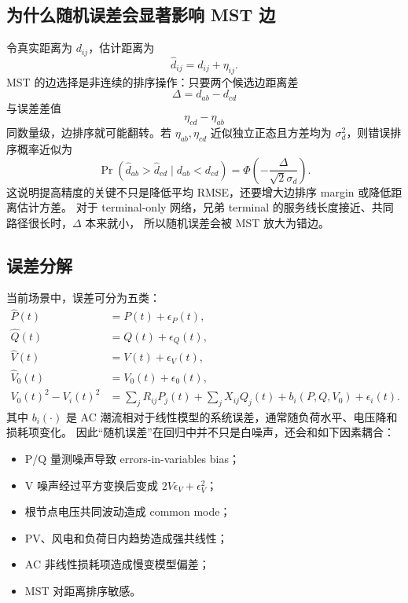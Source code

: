 \documentclass[UTF8,11pt]{ctexart}
\begin{document}
\subsection{为什么随机误差会显著影响 MST 边}

令真实距离为 $d_{ij}$，估计距离为
\[
    \widehat d_{ij}=d_{ij}+\eta_{ij}.
\]
MST 的边选择是非连续的排序操作：只要两个候选边距离差
\[
    \Delta = d_{ab}-d_{cd}
\]
与误差差值
\[
    \eta_{cd}-\eta_{ab}
\]
同数量级，边排序就可能翻转。若 $\eta_{ab},\eta_{cd}$ 近似独立正态且方差均为 $\sigma_d^2$，则错误排序概率近似为
\begin{equation}
    \Pr(\widehat d_{ab}>\widehat d_{cd}\mid d_{ab}<d_{cd})
    =
    \Phi\!\left(-\frac{\Delta}{\sqrt{2}\sigma_d}\right).
    \label{eq:edge-flip}
\end{equation}
这说明提高精度的关键不只是降低平均 RMSE，还要增大边排序 margin 或降低距离估计方差。
对于 terminal-only 网络，兄弟 terminal 的服务线长度接近、共同路径很长时，$\Delta$ 本来就小，
所以随机误差会被 MST 放大为错边。

\subsection{误差分解}

当前场景中，误差可分为五类：
\begin{align}
    \widehat P(t)&=P(t)+\epsilon_P(t),\\
    \widehat Q(t)&=Q(t)+\epsilon_Q(t),\\
    \widehat V(t)&=V(t)+\epsilon_V(t),\\
    \widehat V_0(t)&=V_0(t)+\epsilon_0(t),\\
    V_0(t)^2-V_i(t)^2
    &=\sum_j R_{ij}P_j(t)+\sum_jX_{ij}Q_j(t)+b_i(P,Q,V_0)+\epsilon_i(t).
\end{align}
其中 $b_i(\cdot)$ 是 AC 潮流相对于线性模型的系统误差，通常随负荷水平、电压降和损耗项变化。
因此“随机误差”在回归中并不只是白噪声，还会和如下因素耦合：

\begin{itemize}[leftmargin=2em]
  \item P/Q 量测噪声导致 errors-in-variables bias；
  \item V 噪声经过平方变换后变成 $2V\epsilon_V+\epsilon_V^2$；
  \item 根节点电压共同波动造成 common mode；
  \item PV、风电和负荷日内趋势造成强共线性；
  \item AC 非线性损耗项造成慢变模型偏差；
  \item MST 对距离排序敏感。
\end{itemize}
\end{document}
